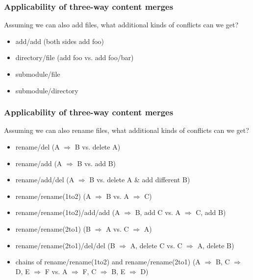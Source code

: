 \documentclass[t]{beamer}
\begin{document}

\begin{frame}
  \frametitle{Applicability of three-way content merges}

  Assuming we can also add files, what additional kinds of conflicts can we get?
  \pause
  \begin{itemize}
    \item add/add (both sides add foo)
    \pause
    \item directory/file (add foo vs. add foo/bar)
    \pause
    \item submodule/file
    \pause
    \item submodule/directory
  \end{itemize}

\end{frame}


\begin{frame}
  \frametitle{Applicability of three-way content merges}

  Assuming we can also rename files, what additional kinds of
  conflicts can we get?
  \pause
  \begin{itemize}
    \item rename/del
          {\scriptsize (A $\Rightarrow$ B vs. delete A)}
    \pause
    \item rename/add
          {\scriptsize (A $\Rightarrow$ B vs. add B)}
    \pause
    \item rename/add/del
          {\scriptsize (A $\Rightarrow$ B vs. delete A \& add different B)}
    \pause
    \item rename/rename(1to2)
          {\scriptsize (A $\Rightarrow$ B vs. A $\Rightarrow$ C)}
    \pause
    \item rename/rename(1to2)/add/add
          {\scriptsize (A $\Rightarrow$ B, add C vs. A $\Rightarrow$ C, add B)}
    \pause
    \item rename/rename(2to1)
          {\scriptsize (B $\Rightarrow$ A vs. C $\Rightarrow$ A)}
    \pause
    \item rename/rename(2to1)/del/del
          {\scriptsize (B $\Rightarrow$ A, delete C vs.
                        C $\Rightarrow$ A, delete B)}
    \pause
    \item chains of rename/rename(1to2) and rename/rename(2to1)
          {\scriptsize (A $\Rightarrow$ B, C $\Rightarrow$ D, E $\Rightarrow$ F
                        vs.
                        A $\Rightarrow$ F, C $\Rightarrow$ B, E $\Rightarrow$ D)}

  \end{itemize}

\end{frame}
\end{document}
